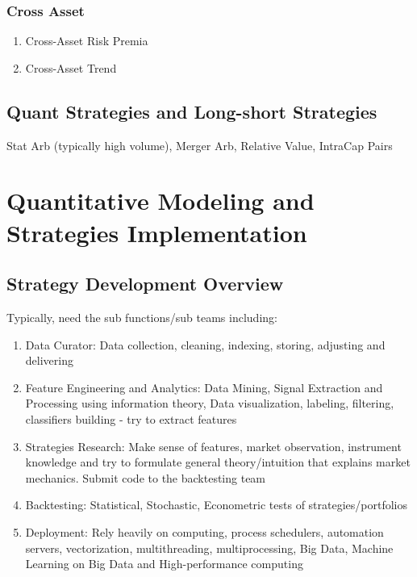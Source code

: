 \documentclass[11pt, openany]{book}              %
\begin{document}
\section{Cross Asset}

\begin{enumerate}
 \item Cross-Asset Risk Premia
 \item Cross-Asset Trend
\end{enumerate}


\chapter{Quant Strategies and Long-short Strategies}

Stat Arb (typically high volume), Merger Arb, Relative Value, IntraCap Pairs 
 

\part{Quantitative Modeling and Strategies Implementation}

\chapter{Strategy Development Overview}

Typically, need the sub functions/sub teams including:

\begin{enumerate}
 \item Data Curator: Data collection, cleaning, indexing, storing, adjusting and delivering 
 \item Feature Engineering and Analytics: Data Mining, Signal Extraction and Processing using information theory, Data visualization, labeling, filtering, classifiers building - try to extract features
 \item Strategies Research: Make sense of features, market observation, instrument knowledge and try to formulate general theory/intuition that explains market mechanics. Submit code to the backtesting team
 \item Backtesting: Statistical, Stochastic, Econometric tests of strategies/portfolios
 \item Deployment: Rely heavily on computing, process schedulers, automation servers, vectorization, multithreading, multiprocessing, Big Data, Machine Learning on Big Data and High-performance computing 
\end{enumerate}
\end{document}
